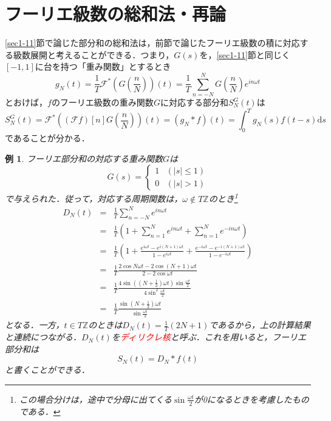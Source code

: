 \documentclass[a4j]{jsbook}
\newtheorem{example}[theorem]{例}
\numberwithin{theorem}{chapter}  %
\begin{document}
\section{フーリエ級数の総和法・再論} \label{sec2-5}
\ref{sec1-11}節で論じた部分和の総和法は，前節で論じたフーリエ級数の積に対応する級数展開と考えることができる．つまり，\(G(s)\)を，\ref{sec1-11}節と同じく\([-1, 1]\)に台を持つ「重み関数」とするとき
\begin{equation*}
    g_N(t)=\frac{1}{T}\mathcal{F}^*\left(G\left(\frac{n}{N}\right)\right)(t)=\frac{1}{T}\sum_{n=-N}^N G\left(\frac{n}{N}\right)e^{in\omega t}
\end{equation*}
とおけば，\(f\)のフーリエ級数の重み関数\(G\)に対応する部分和\(S_N^G(t)\)は
\begin{equation*}
    S_N^G(t)=\mathcal{F}^*\left((\mathcal{F}f)[n]G\left(\frac{n}{N}\right)\right)(t)=(g_N*f)(t)=\int_0^T g_N(s)f(t-s)\mathrm{d}s
\end{equation*}
であることが分かる．
\begin{example} 
\label{ex2-7}
フーリエ部分和の対応する重み関数\(G\)は
\begin{equation*}
    G(s)=
    \begin{cases}
    1 & (|s|\leq 1) \\
    0 & (|s|>1)
    \end{cases}
\end{equation*}
で与えられた．従って，対応する周期関数は，\(\omega\notin T\mathbb{Z}\)のとき\footnote{この場合分けは，途中で分母に出てくる\(\displaystyle\sin\frac{\omega t}{2}\)が0になるときを考慮したものである．}
\begin{eqnarray*}
D_N(t)&=&\frac{1}{T}\sum_{n=-N}^N e^{in\omega t} \\
&=&\frac{1}{T}\left(1+\sum_{n=1}^N e^{in\omega t}+\sum_{n=1}^N e^{-in\omega t}\right) \\
&=&\frac{1}{T}\left(1+\frac{e^{i\omega t}-e^{i(N+1)\omega t}}{1-e^{i\omega t}}+\frac{e^{-i\omega t}-e^{-i(N+1)\omega t}}{1-e^{-i\omega t}}\right) \\
&=&\frac{1}{T}\frac{2\cos N\omega t-2\cos(N+1)\omega t}{2-2\cos\omega t} \\
&=&\frac{1}{T}\frac{4\sin\left(\left(N+\frac{1}{2}\right)\omega t\right)\sin\frac{\omega t}{2}}{4\sin^2\frac{\omega t}{2}} \\
&=&\frac{1}{T}\frac{\sin\left(N+\frac{1}{2}\right)\omega t}{\sin\frac{\omega t}{2}}
\end{eqnarray*}
となる．一方，\(t\in T\mathbb{Z}\)のときは\(\displaystyle D_N(t)=\frac{1}{T}(2N+1)\)であるから，上の計算結果と連続につながる．\(D_N(t)\)を\textcolor{red}{ディリクレ核}と呼ぶ．これを用いると，フーリエ部分和は
\begin{equation*}
    S_N(t)=D_N*f(t)
\end{equation*}
と書くことができる．
\end{example}
\end{document}
